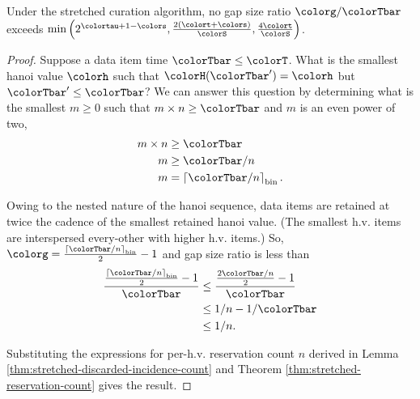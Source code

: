 \begin{theorem}
\label{thm:stretched-gap-size}
Under the stretched curation algorithm, no gap size ratio $\colorg/\colorTbar$ exceeds $\min\Big(
  2^{\colortau+1-\colors}
  ,
  \frac{2(\colort + \colors)}{\colorS},
  \frac{4\colort}{\colorS}
\Big)$.
\end{theorem}
\begin{proof}

Suppose a data item time $\colorTbar \leq \colorT$.
What is the smallest hanoi value $\colorh$ such that $\colorH(\colorTbar') = \colorh$ but $\colorTbar' \leq \colorTbar$?
We can answer this question by determining what is the smallest $m \geq 0$ such that $m \times n \geq \colorTbar$ and $m$ is an even power of two,
\begin{align*}
m \times n
&\geq \colorTbar\\
m
&\geq \colorTbar / n\\
m
&= \left\lceil \colorTbar / n \right\rceil_{\mathrm{bin}}.
\end{align*}

Owing to the nested nature of the hanoi sequence, data items are retained at twice the cadence of the smallest retained hanoi value.
(The smallest h.v. items are interspersed every-other with higher h.v. items.)
So, $\colorg = \frac{\left\lceil \colorTbar / n \right\rceil_{\mathrm{bin}}}{2} - 1$ and gap size ratio is less than
\begin{align*}
\frac{
\frac{\left\lceil \colorTbar / n \right\rceil_{\mathrm{bin}}}{2} - 1
}{
\colorTbar
}
&\leq
\frac{
\frac{2\colorTbar / n}{2} - 1
}{
\colorTbar
}\\
&\leq
1 / n - 1 / \colorTbar\\
&\leq
1 / n.
\end{align*}

Substituting the expressions for per-h.v. reservation count $n$ derived in Lemma \ref{thm:stretched-discarded-incidence-count} and Theorem \ref{thm:stretched-reservation-count} gives the result.
\end{proof}
